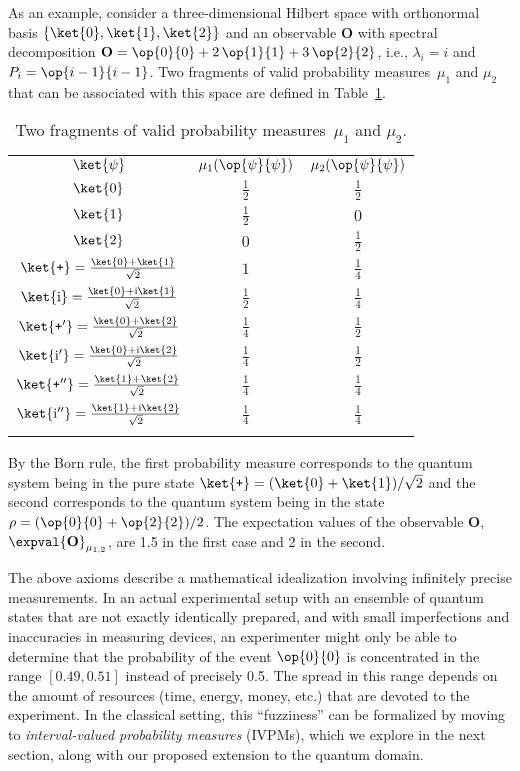 \documentclass[english,reprint, aps, prl,superscriptaddress, showpacs,
showkeys, longbibliography, amsmath, amssymb, floatfix]{revtex4-1}
\theoremstyle{plain}
\theoremstyle{definition}
\newcommand{\proj}[1]{\op{#1}{#1}}
\newcommand{\ps}{\texttt{+}}
\newcommand{\rmi}{\mathrm{i}}
\begin{document}
As an example, consider a three-dimensional Hilbert space with orthonormal
basis $\{\ket{0},\ket{1},\ket{2}\}$ and an observable $\mathbf{O}$
with spectral decomposition $\mathbf{O}=\proj{0}+2\,\proj{1}+3\,\proj{2}$,
i.e., $\lambda_{i}=i$ and $P_{i}=\proj{i-1}$. Two fragments of valid
probability measures~$\mu_{1}$ and $\mu_{2}$ that can be associated
with this space are defined in Table~\ref{tab:quantum-probability-measure}.
\begin{table}
\noindent \centering{}\caption{\label{tab:quantum-probability-measure}Two fragments of valid probability
measures~$\mu_{1}$ and $\mu_{2}$.}
\begin{tabular}{ccc}
\toprule 
\addlinespace
$\ket{\psi}$ & $\mu_{1}(\proj{\psi})$ & $\mu_{2}(\proj{\psi})$\tabularnewline\addlinespace
\midrule
\midrule 
\addlinespace
$\ket{0}$ & $\frac{1}{2}$ & $\frac{1}{2}$\tabularnewline\addlinespace
\midrule 
\addlinespace
$\ket{1}$ & $\frac{1}{2}$ & $0$\tabularnewline\addlinespace
\midrule 
\addlinespace
$\ket{2}$ & $0$ & $\frac{1}{2}$\tabularnewline\addlinespace
\midrule 
\addlinespace
$\ket{\ps}=\frac{\ket{0}+\ket{1}}{\sqrt{2}}$ & $1$ & $\frac{1}{4}$\tabularnewline\addlinespace
\midrule 
\addlinespace
$\ket{\rmi}=\frac{\ket{0}+\rmi\ket{1}}{\sqrt{2}}$ & $\frac{1}{2}$ & $\frac{1}{4}$\tabularnewline\addlinespace
\midrule 
\addlinespace
$\ket{\ps'}=\frac{\ket{0}+\ket{2}}{\sqrt{2}}$ & $\frac{1}{4}$ & $\frac{1}{2}$\tabularnewline\addlinespace
\midrule 
\addlinespace
$\ket{\rmi'}=\frac{\ket{0}+\rmi\ket{2}}{\sqrt{2}}$ & $\frac{1}{4}$ & $\frac{1}{2}$\tabularnewline\addlinespace
\midrule 
\addlinespace
$\ket{\ps''}=\frac{\ket{1}+\ket{2}}{\sqrt{2}}$ & $\frac{1}{4}$ & $\frac{1}{4}$\tabularnewline\addlinespace
\midrule 
\addlinespace
$\ket{\rmi''}=\frac{\ket{1}+\rmi\ket{2}}{\sqrt{2}}$ & $\frac{1}{4}$ & $\frac{1}{4}$\tabularnewline\addlinespace
\bottomrule
\end{tabular}
\end{table}
By the Born rule, the first probability measure corresponds to the
quantum system being in the pure state $\ket{\ps}=(\ket{0}+\ket{1})/\sqrt{2}$
and the second corresponds to the quantum system being in the state
$\rho=(\proj{0}+\proj{2})/2$. The expectation values of the observable
$\mathbf{O}$, $\expval{\mathbf{O}}_{\mu_{1,2}}$, are 1.5 in the
first case and 2 in the second.

The above axioms describe a mathematical idealization involving
infinitely precise measurements. In an actual experimental setup with
an ensemble of quantum states that are not exactly identically
prepared, and with small imperfections and inaccuracies in measuring
devices, an experimenter might only be able to determine that the
probability of the event $\proj{0}$ is concentrated in the range $[0.49,0.51]$
instead of precisely 0.5. The spread in this range depends on the
amount of resources (time, energy, money, etc.) that are devoted to
the experiment. In the classical setting, this ``fuzziness'' can be
formalized by moving to \emph{interval-valued probability measures}
(IVPMs), which we explore in the next section, along with our proposed
extension to the quantum domain.
\end{document}
